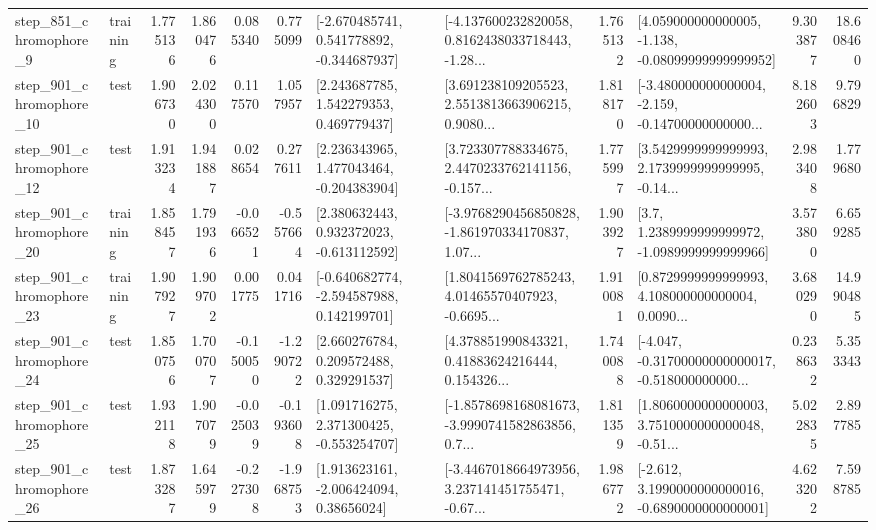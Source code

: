 \begin{tabular}{llrrrrllrlrr}
   step\_851\_chromophore\_9 &  training &      1.775136 &    1.860476 &      0.085340 &  0.775099 &   [-2.670485741, 0.541778892, -0.344687937] &  [-4.137600232820058, 0.8162438033718443, -1.28... &       1.765132 &  [4.059000000000005, -1.138, -0.08099999999999952] &            9.303877 &         18.608460 \\
  step\_901\_chromophore\_10 &      test &      1.906730 &    2.024300 &      0.117570 &  1.057957 &     [2.243687785, 1.542279353, 0.469779437] &  [3.691238109205523, 2.5513813663906215, 0.9080... &       1.818170 &  [-3.480000000000004, -2.159, -0.14700000000000... &            8.182603 &          9.796829 \\
  step\_901\_chromophore\_12 &      test &      1.913234 &    1.941887 &      0.028654 &  0.277611 &    [2.236343965, 1.477043464, -0.204383904] &  [3.723307788334675, 2.4470233762141156, -0.157... &       1.775997 &  [3.5429999999999993, 2.1739999999999995, -0.14... &            2.983408 &          1.779680 \\
  step\_901\_chromophore\_20 &  training &      1.858457 &    1.791936 &     -0.066521 & -0.557664 &    [2.380632443, 0.932372023, -0.613112592] &  [-3.9768290456850828, -1.861970334170837, 1.07... &       1.903927 &     [3.7, 1.2389999999999972, -1.0989999999999966] &            3.573800 &          6.659285 \\
  step\_901\_chromophore\_23 &  training &      1.907927 &    1.909702 &      0.001775 &  0.041716 &   [-0.640682774, -2.594587988, 0.142199701] &  [1.8041569762785243, 4.01465570407923, -0.6695... &       1.910081 &  [0.8729999999999993, 4.108000000000004, 0.0090... &            3.680290 &         14.990485 \\
  step\_901\_chromophore\_24 &      test &      1.850756 &    1.700707 &     -0.150050 & -1.290722 &     [2.660276784, 0.209572488, 0.329291537] &  [4.378851990843321, 0.41883624216444, 0.154326... &       1.740088 &  [-4.047, -0.31700000000000017, -0.518000000000... &            0.238632 &          5.353343 \\
  step\_901\_chromophore\_25 &      test &      1.932118 &    1.907079 &     -0.025039 & -0.193608 &    [1.091716275, 2.371300425, -0.553254707] &  [-1.8578698168081673, -3.9990741582863856, 0.7... &       1.811359 &  [1.8060000000000003, 3.7510000000000048, -0.51... &            5.022835 &          2.897785 \\
  step\_901\_chromophore\_26 &      test &      1.873287 &    1.645979 &     -0.227308 & -1.968753 &     [1.913623161, -2.006424094, 0.38656024] &  [-3.4467018664973956, 3.237141451755471, -0.67... &       1.986772 &  [-2.612, 3.1990000000000016, -0.6890000000000001] &            4.623202 &          7.598785 \\

\end{tabular}
